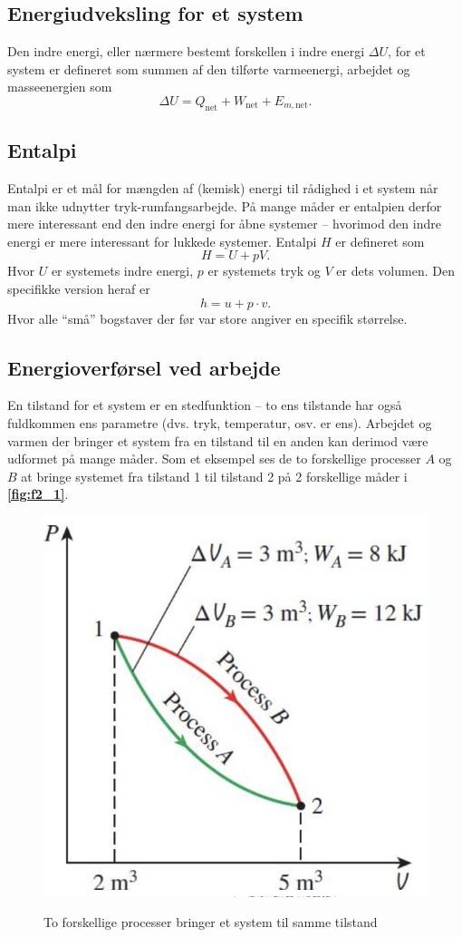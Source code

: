 \subsection{Energiudveksling for et system}
Den indre energi, eller nærmere bestemt forskellen i indre energi $\Delta U$, for et system er defineret som summen af den tilførte varmeenergi, arbejdet og masseenergien som
\[ 
\Delta U = Q_{\mathrm{net}} + W_{\mathrm{net}} + E_{m, \mathrm{net}}
.\]

\subsection{Entalpi}
Entalpi er et mål for mængden af (kemisk) energi til rådighed i et system når man ikke udnytter tryk-rumfangsarbejde. På mange måder er entalpien derfor mere interessant end den indre energi for åbne systemer -- hvorimod den indre energi er mere interessant for lukkede systemer. Entalpi $H$ er defineret som
\[ 
H = U + pV
.\]
Hvor $U$ er systemets indre energi, $p$ er systemets tryk og $V$ er dets volumen. Den specifikke version heraf er
\[ 
h = u + p \cdot v
.\]
Hvor alle ``små'' bogstaver der før var store angiver en specifik størrelse.

\subsection*{Energioverførsel ved arbejde}
En tilstand for et system er en stedfunktion -- to ens tilstande har også fuldkommen ens parametre (dvs. tryk, temperatur, osv. er ens). Arbejdet og varmen der bringer et system fra en tilstand til en anden kan derimod være udformet på mange måder. Som et eksempel ses de to forskellige processer $A$ og $B$ at bringe systemet fra tilstand 1 til tilstand 2 på 2 forskellige måder i \textbf{\autoref{fig:f2_1}}.
\begin{figure} [ht]
  \centering
  \caption{To forskellige processer bringer et system til samme tilstand}
  \includegraphics[width=0.35\linewidth]{./figures/f2_1.png}
  \label{fig:f2_1}
\end{figure}

